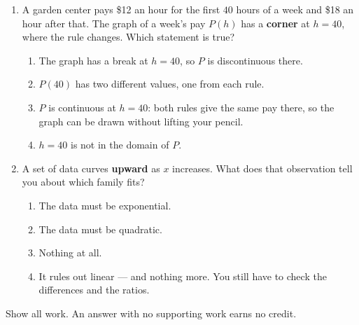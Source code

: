 \begin{enumerate}[leftmargin=1.8em, itemsep=6pt, topsep=5pt]
\item A garden center pays \$12 an hour for the first $40$ hours of a week and \$18 an hour after
that. The graph of a week's pay $P(h)$ has a \textbf{corner} at $h=40$, where the rule changes.
Which statement is true?
\begin{enumerate}[label=(\Alph*), leftmargin=2.2em, itemsep=1pt, topsep=2pt]
  \item The graph has a break at $h=40$, so $P$ is discontinuous there.
  \item $P(40)$ has two different values, one from each rule.
  \item $P$ is continuous at $h=40$: both rules give the same pay there, so the graph can be drawn
        without lifting your pencil.
  \item $h=40$ is not in the domain of $P$.
\end{enumerate}

\item A set of data curves \textbf{upward} as $x$ increases. What does that observation tell you
about which family fits?
\begin{enumerate}[label=(\Alph*), leftmargin=2.2em, itemsep=1pt, topsep=2pt]
  \item The data must be exponential.
  \item The data must be quadratic.
  \item Nothing at all.
  \item It rules out linear --- and nothing more. You still have to check the differences and the
        ratios.
\end{enumerate}

\end{enumerate}


\noindent\small Show all work. An answer with no supporting work earns no credit.

